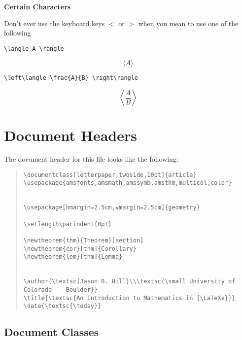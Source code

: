 \documentclass[letterpaper,twoside,10pt]{article}
\begin{document}
\newpage
\textbf{Certain Characters}

Don't ever use the keyboard keys $<$ or $>$ when you mean to use one of the following

\begin{multicols}{2}
\small{\begin{verbatim}
\langle A \rangle
\end{verbatim}}
\[
\langle A \rangle
\]
\end{multicols}


\begin{multicols}{2}
\small{\begin{verbatim}
\left\langle \frac{A}{B} \right\rangle
\end{verbatim}}
\[
\left\langle \frac{A}{B} \right\rangle
\]
\end{multicols}















\newpage
\section{Document Headers}

The document header for this file looks like the following:
\begin{quote}{\small\begin{verbatim}
\documentclass[letterpaper,twoside,10pt]{article}
\usepackage{amsfonts,amsmath,amssymb,amsthm,multicol,color}


\usepackage[hmargin=2.5cm,vmargin=2.5cm]{geometry}

\setlength\parindent{0pt}

\newtheorem{thm}{Theorem}[section]
\newtheorem{cor}[thm]{Corollary}
\newtheorem{lem}[thm]{Lemma}


\author{\textsc{Jason B. Hill}\\\textsc{\small University of Colorado -- Boulder}}
\title{\textsc{An Introduction to Mathematics in {\LaTeXe}}}
\date{\textsc{\today}}
\end{verbatim}}\end{quote}

\subsection{Document Classes}
\end{document}
